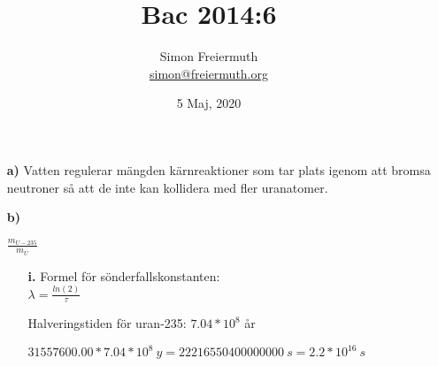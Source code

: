 \documentclass[12pt, letterpaper, twoside]{article}
\title{Bac 2014:6}
\author{Simon Freiermuth \\ \href{mailto:simon@freiermuth.org}{simon@freiermuth.org}}
\date{5 Maj, 2020}
\begin{document}
\maketitle

\begin{flushleft}

\begin{itemize}

    \item[\textbf{a)}]
    Vatten regulerar mängden kärnreaktioner som tar plats igenom att bromsa
    neutroner så att de inte kan kollidera med fler uranatomer.

    \item[\textbf{b)}]

    $ \frac{m_{U-235}}{m_U} $

    \begin{itemize}
	\item[\textbf{i.}]
	Formel för sönderfallskonstanten:\\
	$ \lambda = \frac{ln(2)}{\tau} $

	Halveringstiden för uran-235: $ 7.04*10^8 $ år

	$ 31557600.00*7.04*10^8\ y = 22216550400000000\ s = 2.2*10^{16}\ s $

	$   $


    \end{itemize}

\end{itemize}

\end{flushleft}
\end{document}
